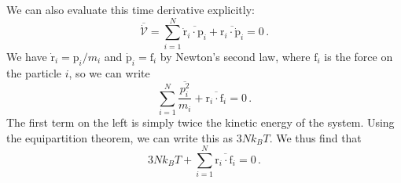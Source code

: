 \documentclass{article}
\theoremstyle{plain}\theoremheaderfont{\normalfont\bfseries}\theorembodyfont{\rmfamily}\theoremseparator{.}\newtheorem*{thm}{Theorem}\newtheorem*{law}{Law}\newtheorem*{pos}{Postulate}
\numberwithin{equation}{section}
\newcommand{\vb}[1]{\bm{\mathrm{#1}}}
\newcommand{\vdot}{\,\bm{\mathrm{\cdot}}\,}
\begin{document}
    We can also evaluate this time derivative explicitly:
    \begin{equation}
        \overline{\dot{\mathcal{V}}}=\sum_{i=1}^{N}\overline{\dot{\vb{r}}_i\vdot\vb{p}_i}+\overline{\vb{r}_i\vdot\dot{\vb{p}}_i}=0\,.
    \end{equation}
    We have \(\dot{\vb{r}}_i=\vb{p}_i/m_i\) and \(\dot{\vb{p}}_i=\vb{f}_i\) by Newton's second law, where \(\vb{f}_i\) is the force on the particle \(i\), so we can write
    \begin{equation}
        \sum_{i=1}^{N}\frac{\overline{p_i^2}}{m_i}+\overline{\vb{r}_i\vdot\vb{f}_i}=0\,.
    \end{equation}
    The first term on the left is simply twice the kinetic energy of the system. Using the equipartition theorem, we can write this as \(3Nk_BT\). We thus find that
    \begin{equation}
        3Nk_B T+\sum_{i=1}^{N}\overline{\vb{r}_i\vdot\vb{f}_i}=0\,.
    \end{equation}
\end{document}
